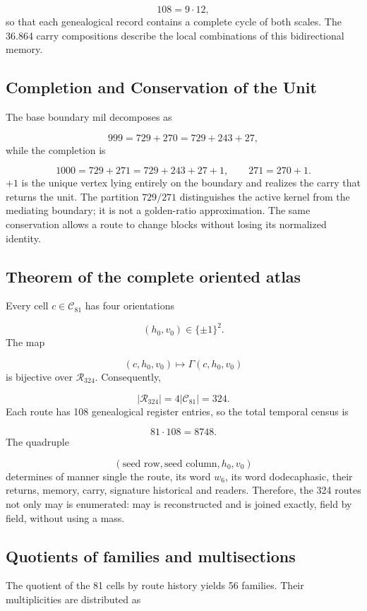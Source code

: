 \[
 108=9\cdot12,
\]
so that each genealogical record contains a complete cycle of both scales. The 36.864 carry compositions describe the local combinations of this bidirectional memory.

\subsection{Completion and Conservation of the Unit}
The base boundary mil decomposes as

\[
 999=729+270=729+243+27,
\]
while the completion is

\[
 1000=729+271=729+243+27+1,
\qquad
 271=270+1.
\]
\(+1\) is the unique vertex lying entirely on the boundary and realizes the carry that returns the unit. The partition \(729/271\) distinguishes the active kernel from the mediating boundary; it is not a golden-ratio approximation. The same conservation allows a route to change blocks without losing its normalized identity.

\subsection{Theorem of the complete oriented atlas}
Every cell \(c\in\mathcal C_{81}\) has four orientations

\[
 (h_0,v_0)\in\{\pm1\}^2.
\]
The map

\[
 (c,h_0,v_0)\longmapsto\Gamma(c,h_0,v_0)
\]
is bijective over \(\mathcal R_{324}\). Consequently,

\[
 |\mathcal R_{324}|=4|\mathcal C_{81}|=324.
\]
Each route has 108 genealogical register entries, so the total temporal census is

\[
 81\cdot108=8748.
\]
The quadruple

\[
 (\text{seed row},\text{seed column},h_0,v_0)
\]
determines of manner single the route, its word \(w_6\), its word dodecaphasic, their returns, memory, carry, signature historical and readers. Therefore, the 324 routes not only may is enumerated: may is reconstructed and is joined exactly, field by field, without using a mass.

\subsection{Quotients of families and multisections}
The quotient of the 81 cells by route history yields 56 families. Their multiplicities are distributed as


